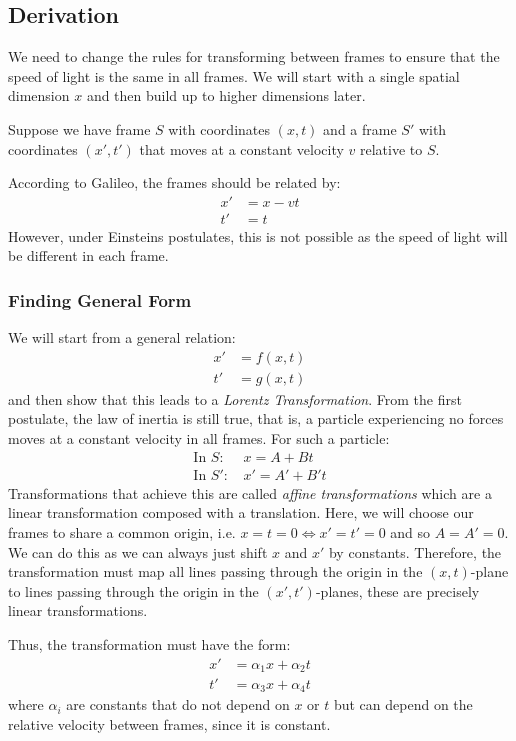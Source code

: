 \documentclass[../main.tex]{subfiles}
\begin{document}
\subsection{Derivation}
We need to change the rules for transforming between frames to ensure that the speed of light is the same in all frames.
We will start with a single spatial dimension $x$ and then build up to higher dimensions later.

Suppose we have frame $S$ with coordinates $(x, t)$ and a frame $S'$ with coordinates $(x', t')$ that moves at a constant velocity $v$ relative to $S$.

According to Galileo, the frames should be related by:
\begin{align*}
  x' &= x - vt \\
  t' &= t
\end{align*}
However, under Einsteins postulates, this is not possible as the speed of light will be different in each frame.

\subsubsection{Finding General Form}
We will start from a general relation:
\begin{align*}
  x' &= f(x, t) \\
  t' &= g(x, t)
\end{align*}
and then show that this leads to a \textit{Lorentz Transformation}.
From the first postulate, the law of inertia is still true, that is, a particle experiencing no forces moves at a constant velocity in all frames.
For such a particle:
\begin{align*}
  \text{In $S$: }& x = A + Bt \\
  \text{In $S'$: }& x' = A' + B't
\end{align*}
Transformations that achieve this are called \textit{affine transformations} which are a linear transformation composed with a translation.
Here, we will choose our frames to share a common origin, i.e. $x = t = 0 \iff x' = t' = 0$ and so $A = A' = 0$.
We can do this as we can always just shift $x$ and $x'$ by constants.
Therefore, the transformation must map all lines passing through the origin in the $(x, t)$-plane to lines passing through the origin in the $(x', t')$-planes, these are precisely linear transformations.

Thus, the transformation must have the form:
\begin{align*}
  x' &= \alpha_1x + \alpha_2t \\
  t' &= \alpha_3x + \alpha_4t
\end{align*}
where $\alpha_i$ are constants that do not depend on $x$ or $t$ but can depend on the relative velocity between frames, since it is constant.
\end{document}
